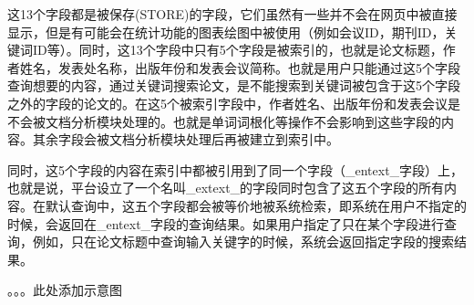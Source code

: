     这13个字段都是被保存(STORE)的字段，它们虽然有一些并不会在网页中被直接显示，但是有可能会在统计功能的图表绘图中被使用（例如会议ID，期刊ID，关键词ID等）。同时，这13个字段中只有5个字段是被索引的，也就是论文标题，作者姓名，发表处名称，出版年份和发表会议简称。也就是用户只能通过这5个字段查询想要的内容，通过关键词搜索论文，是不能搜索到关键词被包含于这5个字段之外的字段的论文的。在这5个被索引字段中，作者姓名、出版年份和发表会议是不会被文档分析模块处理的。也就是单词词根化等操作不会影响到这些字段的内容。其余字段会被文档分析模块处理后再被建立到索引中。

    同时，这5个字段的内容在索引中都被引用到了同一个字段（\_entext\_字段）上，也就是说，平台设立了一个名叫\_extext\_的字段同时包含了这五个字段的所有内容。在默认查询中，这五个字段都会被等价地被系统检索，即系统在用户不指定的时候，会返回在\_entext\_字段的查询结果。如果用户指定了只在某个字段进行查询，例如，只在论文标题中查询输入关键字的时候，系统会返回指定字段的搜索结果。

    。。。此处添加示意图